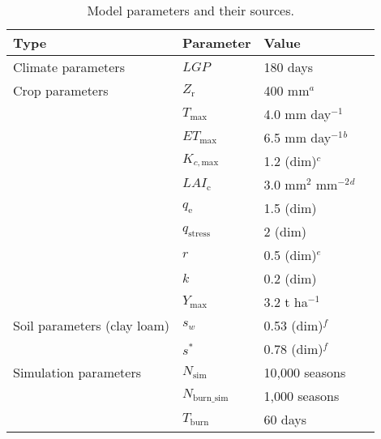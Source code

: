 
\begin{table} %
\caption{Model parameters and their sources.} %
\label{table:parameters}
\centering
\begin{tabular}{lll l}
\hline
 Type & Parameter  & Value \\ %
\hline
   Climate parameters & $LGP$  & 180 days \\ %
\hline
 Crop parameters &  $Z_{\text{r}}$  & 400 mm$^{a}$ \\ %
 & $T_\text{max}$  & 4.0 mm day$^{-1}$   \\ %
 & $ET_\text{max}$  & 6.5 mm day$^{-1}$$^{b}$ \\
 & $K_{c, \text{max}}$ &  1.2 (dim)$^{c}$ \\ %
 & $LAI_\text{c}$  & 3.0 mm$^{2}$ mm$^{-2}$$^{d}$\\ %
 & $q_\text{e}$ & 1.5 (dim) \\
 & $q_{\text{stress}}$ & 2 (dim) \\
 & $r$ & 0.5 (dim)$^{e}$ \\ %
 & $k$ & 0.2 (dim) \\ %
 & $Y_\text{max}$ & 3.2 t ha$^{-1}$ \\
 \hline
 Soil parameters (clay loam) & $s_w$ & 0.53 (dim)$^{f}$ \\ %
 & $s^*$ & 0.78 (dim)$^{f}$ \\ %
 \hline
 Simulation parameters & $N_{\text{sim}}$ & 10,000 seasons \\
 & $N_{\text{burn\_sim}}$  & 1,000 seasons \\ 
 & $T_\text{burn}$ & 60 days \\

\end{tabular}
\end{table}

